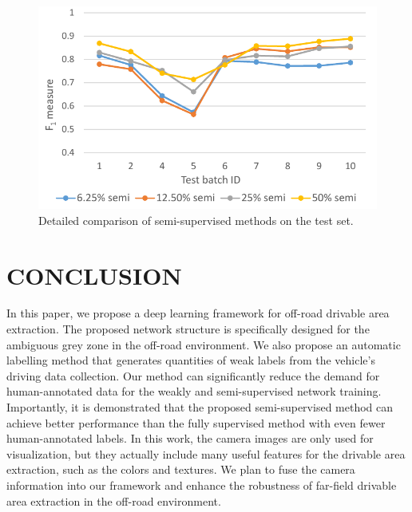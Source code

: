 \documentclass[letterpaper, 10 pt, conference]{ieeeconf}  %
\begin{document}
\begin{figure}[h]
	\centering
	\includegraphics[scale=0.6]{semiSupvisedResult.pdf}
	\caption{Detailed comparison of semi-supervised methods on the test set.}
	\label{fig:semi_curve}
	\vspace{-2mm}
\end{figure}

\section{CONCLUSION}   \label{sec:conlusion}
In this paper, we propose a deep learning framework for off-road drivable area extraction. The proposed network structure is specifically designed for the ambiguous grey zone in the off-road environment. We also propose an automatic labelling method that generates quantities of weak labels from the vehicle's driving data collection. Our method can significantly reduce the demand for human-annotated data for the weakly and semi-supervised network training.
Importantly, it is demonstrated that the proposed semi-supervised method can achieve better performance than the fully supervised method with even fewer human-annotated labels. In this work, the camera images are only used for visualization, but they actually include many useful features for the drivable area extraction, such as the colors and textures. We plan to fuse the camera information into our framework and enhance the robustness of far-field drivable area extraction in the off-road environment.

\end{document}
